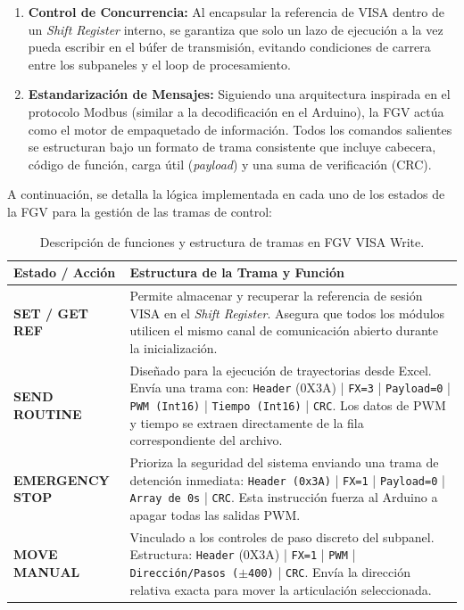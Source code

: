\begin{enumerate}
	\item \textbf{Control de Concurrencia:} Al encapsular la referencia de VISA dentro de un \textit{Shift Register} interno, se garantiza que solo un lazo de ejecución a la vez pueda escribir en el búfer de transmisión, evitando condiciones de carrera entre los subpaneles y el loop de procesamiento.
	\item \textbf{Estandarización de Mensajes:} Siguiendo una arquitectura inspirada en el protocolo Modbus (similar a la decodificación en el Arduino), la FGV actúa como el motor de empaquetado de información. Todos los comandos salientes se estructuran bajo un formato de trama consistente que incluye cabecera, código de función, carga útil (\textit{payload}) y una suma de verificación (CRC).
\end{enumerate}

A continuación, se detalla la lógica implementada en cada uno de los estados de la FGV para la gestión de las tramas de control:

\begin{table}[h!]
	\centering
	\renewcommand{\arraystretch}{1.5}
	\caption{Descripción de funciones y estructura de tramas en FGV VISA Write.}
	\label{tab:fgv_visa_write_cases}
	\begin{tabularx}{\textwidth}{|l|X|}
		\hline
		\rowcolor{green!20}
		\textbf{Estado / Acción} & \textbf{Estructura de la Trama y Función} \\ \hline
		\textbf{SET / GET REF} & Permite almacenar y recuperar la referencia de sesión VISA en el \textit{Shift Register}. Asegura que todos los módulos utilicen el mismo canal de comunicación abierto durante la inicialización. \\ \hline
		\textbf{SEND ROUTINE} & Diseñado para la ejecución de trayectorias desde Excel. Envía una trama con: \texttt{Header} (0X3A) | \texttt{FX=3} | \texttt{Payload=0} | \texttt{PWM (Int16)} | \texttt{Tiempo (Int16)} | \texttt{CRC}. Los datos de PWM y tiempo se extraen directamente de la fila correspondiente del archivo. \\ \hline
		\textbf{EMERGENCY STOP} & Prioriza la seguridad del sistema enviando una trama de detención inmediata: \texttt{Header (0x3A)} | \texttt{FX=1} | \texttt{Payload=0} | \texttt{Array de 0s} | \texttt{CRC}. Esta instrucción fuerza al Arduino a apagar todas las salidas PWM. \\ \hline
		\textbf{MOVE MANUAL} & Vinculado a los controles de paso discreto del subpanel. Estructura: \texttt{Header} (0X3A) | \texttt{FX=1} | \texttt{PWM} | \texttt{Dirección/Pasos ($\pm$400)} | \texttt{CRC}. Envía la dirección relativa exacta para mover la articulación seleccionada. \\ \hline
	\end{tabularx}
\end{table}

